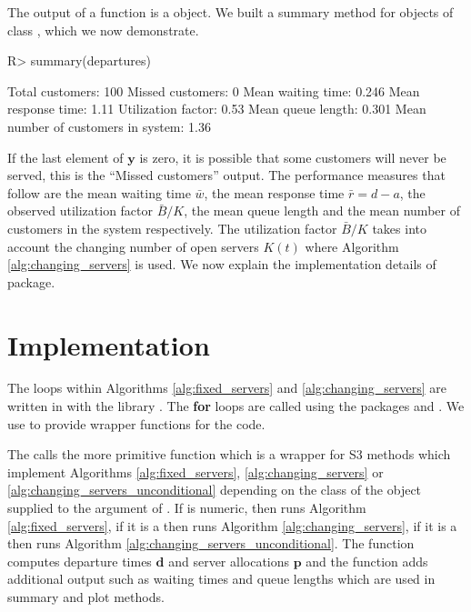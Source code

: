 \documentclass[article]{jss}
\begin{document}
The output of a  function is a  object. We built a summary method for objects of class , which we now demonstrate. 

\begin{CodeChunk}
\begin{Sinput}
R> summary(departures)
\end{Sinput}
\begin{Soutput}
Total customers:
 100
Missed customers:
 0
Mean waiting time:
 0.246
Mean response time:
 1.11
Utilization factor:
 0.53
Mean queue length:
 0.301
Mean number of customers in system:
 1.36
\end{Soutput}
\end{CodeChunk}

If the last element of $\mathbf{y}$ is zero, it is possible that some customers will never be served, this is the ``Missed customers'' output. The performance measures that follow are the mean waiting time $\bar{w}$, the mean response time $\bar{r} = d - a$, the observed utilization factor $\bar{B}/K$, the mean queue length and the mean number of customers in the system respectively. The utilization factor $\bar{B}/K$ takes into account the changing number of open servers $K(t)$ where Algorithm \ref{alg:changing_servers} is used. We now explain the implementation details of package.  


\section{Implementation} \label{sec:Implementation}

The  loops within Algorithms \ref{alg:fixed_servers} and \ref{alg:changing_servers} are written in  with the  library \citep{sanderson2016armadillo}. The  \textbf{for} loops are called using the  packages  \citep{eddelbuettel2011rcpp} and  \citep{eddelbuettel2014rcpparmadillo}. We use  to provide wrapper functions for the  code. 

The  calls the more primitive  function which is a wrapper for S3 methods which implement Algorithms \ref{alg:fixed_servers}, \ref{alg:changing_servers} or \ref{alg:changing_servers_unconditional} depending on the class of the object supplied to the  argument of . If  is numeric, then  runs Algorithm \ref{alg:fixed_servers}, if it is a  then  runs Algorithm \ref{alg:changing_servers}, if it is a  then  runs Algorithm \ref{alg:changing_servers_unconditional}. The  function computes departure times $\mathbf{d}$ and server allocations $\mathbf{p}$ and the  function adds additional output such as waiting times and queue lengths which are used in summary and plot methods.  
\end{document}
